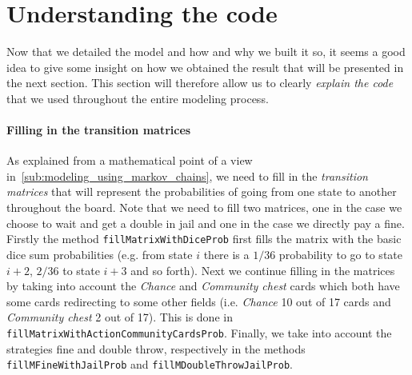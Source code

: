 \section{Understanding the code} %
\label{sec:understanding_the_code}
Now that we detailed the model and how and why we built it so,
it seems a good idea to give some insight on how we obtained
the result that will be presented in the next section.
This section will therefore allow us to clearly \emph{explain the code}
that we used throughout the entire modeling process.

\paragraph{Filling in the transition matrices} %
\label{par:filling_the_transition_matrices}
As explained from a mathematical point of a view 
in~\ref{sub:modeling_using_markov_chains}, we need to fill in the
\emph{transition matrices} that will represent the probabilities
of going from one state to another throughout the board.
Note that we need to fill two matrices, one in the case
we choose to wait and get a double in jail and one in the
case we directly pay a fine.
Firstly the method \lstinline|fillMatrixWithDiceProb| first fills the matrix
with the basic dice sum probabilities (e.g. from state $i$ there is a
$1/36$ probability to go to state $i+2$, $2/36$ to state $i+3$ and so
forth).
Next we continue filling in the matrices by taking into account
the \emph{Chance} and \emph{Community chest} cards which both have
some cards redirecting to some other fields (i.e. \emph{Chance} 10
out of 17 cards and \emph{Community chest} 2 out of 17).
This is done in \lstinline|fillMatrixWithActionCommunityCardsProb|.
Finally, we take into account the strategies fine and double throw,
respectively in the methods \lstinline|fillMFineWithJailProb|
and \lstinline|fillMDoubleThrowJailProb|.


